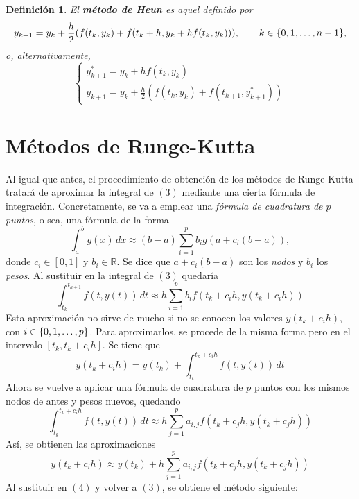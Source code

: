\documentclass[11pt]{report}
\theoremstyle{mytheorem}
\theoremstyle{mydefinition}
\newtheorem{definition}{Definición}
\theoremstyle{myexample}
\newenvironment{cdefinition} %
  {\begin{mdframed}[
        linewidth=3pt,
        linecolor=c1,
        bottomline=false,
        topline=false,
        rightline=false,
        innerrightmargin=0pt,
        innertopmargin=0pt,
        innerbottommargin=0pt,
        innerleftmargin=1em, %
        skipabove=\baselineskip]
    \begin{definition}}
  {\end{definition}\end{mdframed}}
\newcommand{\R}{\mathbb R}
\newcommand{\mybf}[1]{\boldmath\textbf{\color{c1}#1}\unboldmath}
\begin{document}
\begin{cdefinition}
El \mybf{método de Heun} es aquel definido por
\[
y_{k+1}=y_k+\frac{h}{2}(f(t_k,y_{k})+f(t_k+h,y_k+hf(t_k,y_k))), \qquad k \in \{0,1,\mathellipsis,n-1\},
\]
o, alternativamente,
\[\begin{cases}
        y_{k+1}^* = y_k+hf(t_k,y_k) \\[5pt]
        \displaystyle y_{k+1} = y_k+\frac{h}{2}(f(t_k,y_k)+f(t_{k+1},y_{k+1}^*))
\end{cases}\]
\end{cdefinition}

\section{Métodos de Runge-Kutta}
\label{sec1.6}

Al igual que antes, el procedimiento de obtención de los métodos de Runge-Kutta tratará de aproximar la integral de $(3)$ mediante una cierta fórmula de integración. Concretamente, se va a emplear una \emph{fórmula de cuadratura de $p$ puntos}, o sea, una fórmula de la forma
\[\int_a^b g(x)\, dx \approx (b-a)\sum_{i=1}^pb_ig(a+c_i(b-a)),\]
donde $c_i \in [0,1]$ y $b_i \in \R$. Se dice que $a+c_i(b-a)$ son los \emph{nodos} y $b_i$ los \emph{pesos}. Al sustituir en la integral de $(3)$ quedaría
\begin{equation}\int_{t_k}^{t_{k+1}}f(t,y(t))\, dt \approx h \sum_{i=1}^pb_if(t_k+c_ih,y(t_k+c_ih))\end{equation}
Esta aproximación no sirve de mucho si no se conocen los valores $y(t_k+c_ih)$, con $i \in \{0,1,\mathellipsis,p\}$. Para aproximarlos, se procede de la misma forma pero en el intervalo $[t_k,t_k+c_ih]$. Se tiene que
\[y(t_k+c_ih) = y(t_k)+\int_{t_k}^{t_k+c_ih}f(t,y(t)) \, dt\]
Ahora se vuelve a aplicar una fórmula de cuadratura de $p$ puntos con los mismos nodos de antes y pesos nuevos, quedando
\begin{equation}\int_{t_k}^{t_k+c_ih}f(t,y(t))\, dt \approx h\sum_{j=1}^pa_{i,j}f(t_k+c_jh, y(t_k+c_jh))\end{equation}
Así, se obtienen las aproximaciones
\[y(t_k+c_ih) \approx y(t_k) +h\sum_{j=1}^pa_{i,j}f(t_k+c_jh, y(t_k+c_jh))\]
Al sustituir en $(4)$ y volver a $(3)$, se obtiene el método siguiente:
\end{document}
